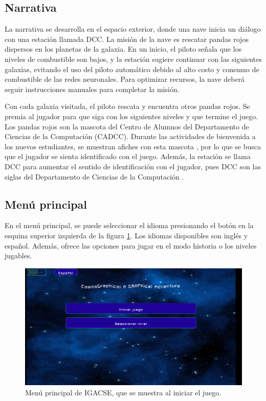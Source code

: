 \subsection{Narrativa}

La narrativa se desarrolla en el espacio exterior, donde una nave inicia un diálogo con una estación llamada DCC. La misión de la nave es rescatar pandas rojos dispersos en los planetas de la galaxia. En un inicio, el piloto señala que los niveles de combustible son bajos, y la estación sugiere continuar con las siguientes galaxias, evitando el uso del piloto automático debido al alto costo y consumo de combustible de las redes neuronales. Para optimizar recursos, la nave deberá seguir instrucciones manuales para completar la misión.

Con cada galaxia visitada, el piloto rescata y encuentra otros pandas rojos. Se premia al jugador para que siga con los siguientes niveles y que termine el juego. Los pandas rojos son la mascota del Centro de Alumnos del Departamento de Ciencias  de la Computación (CADCC).  Durante las actividades de bienvenida a los nuevos estudiantes, se muestran afiches con esta mascota \cite{CADCCPage}, por lo que se busca que el jugador se sienta identificado con el juego. Además, la estación se llama DCC para aumentar el sentido de identificación con el jugador, pues DCC son las siglas del Departamento de Ciencias de la Computación \cite{DCCPage}.


\subsection{Menú principal}

En el menú principal, se puede seleccionar el idioma presionando el botón en la esquina superior izquierda de la figura \ref{MenuPrincipal}. Los idiomas disponibles son inglés y español. Además, ofrece las opciones para jugar en el modo historia o los niveles jugables.

\begin{figure}[h]
	\centering
	\includegraphics[scale=0.3]{imagenes/MainMenu.png}
	\caption{Menú principal de IGACSE, que se muestra al iniciar el juego.}
	\label{MenuPrincipal}
\end{figure}


